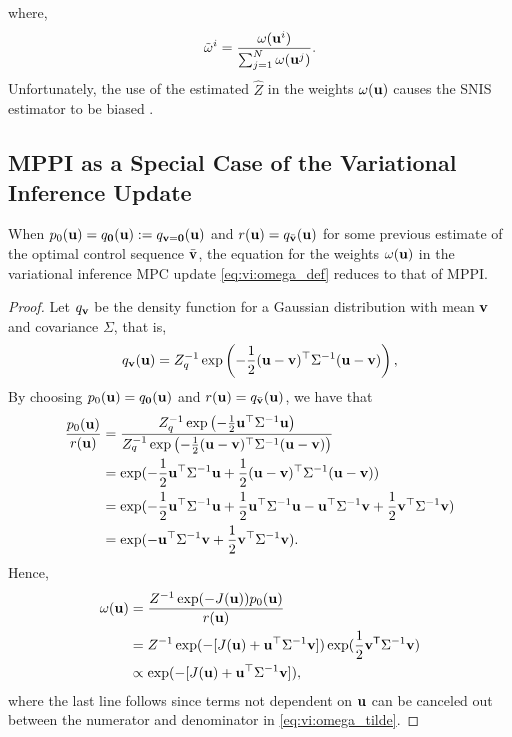 where,
\begin{align}
    \tilde{\omega}^i = \frac{\omega({\bf u}^i)}{\sum^N_{j=1}\omega({\bf u}^j)}.
\end{align}
Unfortunately, the use of the estimated $\hat{Z}$ in the weights $\omega({\bf u})$ causes the SNIS estimator to be biased \cite{owen2013monte}.

\subsection{MPPI as a Special Case of the Variational Inference Update} \label{app:MPPI as VI}
\begin{theorem}
    When $p_0({\bf u}) = q_{\bf 0}({\bf u}) := q_{\bf v = 0}({\bf u})$ and $r({\bf u})=q_{\bar{{\bf v}}}({\bf u})$ for some previous estimate of the optimal control sequence $\bar{{\bf v}}$, the equation for the weights $\omega({\bf u})$ in the variational inference MPC update \eqref{eq:vi:omega_def} reduces to that of MPPI.
\end{theorem}

\begin{proof}
    Let $q_{\bf v}$ be the density function for a Gaussian distribution with mean ${\bf v}$ and covariance $\Sigma$, that is,
    \begin{equation}
        q_{\bf v}({\bf u}) = Z_q^{-1} \exp\left(-\frac{1}{2}({\bf u}-{\bf v})^\top\Sigma^{-1}({\bf u}-{\bf v})\right),
    \end{equation}
    By choosing $p_0({\bf u}) = q_{\bf 0}({\bf u})$ and $r({\bf u})=q_{\bar{{\bf v}}}({\bf u})$, we have that
    \begin{align}
        \frac{p_0({\bf u})}{r({\bf u})}
        &= \frac{ Z_q^{-1} \exp\left(-\frac{1}{2} {\bf u}^\top\Sigma^{-1}{\bf u} \right) }
        { Z_q^{-1} \exp\left(-\frac{1}{2}({\bf u}-{\bf v})^\top\Sigma^{-1}({\bf u}-{\bf v})\right) } \\
        &= \exp(-\frac{1}{2} {\bf u}^\top\Sigma^{-1}{\bf u} + \frac{1}{2}({\bf u}-{\bf v})^\top\Sigma^{-1}({\bf u}-{\bf v})) \\
        &=\exp(-\frac{1}{2} {\bf u}^\top\Sigma^{-1}{\bf u} + \frac{1}{2} {\bf u}^\top\Sigma^{-1}{\bf u} -{\bf u}^\top\Sigma^{-1}{\bf v} + \frac{1}{2}{\bf v}^\top\Sigma^{-1}{\bf v})\\
        &= \exp(-{\bf u}^\top\Sigma^{-1}{\bf v} + \frac{1}{2}{\bf v}^\top\Sigma^{-1}{\bf v}).
    \end{align}
    Hence,
    \begin{align}
        \omega({\bf u})
        &= \frac{Z^{-1} \exp(-J({\bf u})) p_0({\bf u})}{r({\bf u})} \\
        &= Z^{-1} \exp(-[ J({\bf u}) + {\bf u}^\top\Sigma^{-1}{\bf v}]) \exp(\frac{1}{2} {\bf v}^\mathsf{T} \Sigma^{-1} {\bf v}) \\
        &\propto \exp(-[ J({\bf u}) + {\bf u}^\top\Sigma^{-1}{\bf v}]),
    \end{align}
    where the last line follows since terms not dependent on ${\bf u}$ can be canceled out between the numerator and denominator in \eqref{eq:vi:omega_tilde}.
\end{proof}